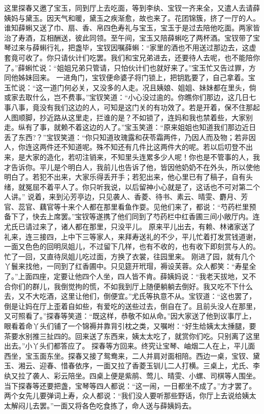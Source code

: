 \documentclass[12pt,oneside]{book}
\begin{document}
这里探春又邀了宝玉，同到厅上去吃面，等到李纨、宝钗一齐来全，又遣人去请薛姨妈与黛玉。因天气和暖，黛玉之疾渐愈，故也来了。花团锦簇，挤了一厅的人。
谁知薛蝌又送了巾、扇、香、帛四色寿礼与宝玉，宝玉于是过去陪他吃面。两家皆治了寿酒，互相酬送，彼此同领。至午间，宝玉又陪薛蝌吃了两杯酒。宝钗带了宝琴过来与薛蝌行礼，把盏毕，宝钗因嘱薛蝌：“家里的酒也不用送过那边去，这虚套竟可收了。你只请伙计们吃罢。我们和宝兄弟进去，还要待人去呢，也不能陪你了。”薛蝌忙说：“姐姐兄弟只管请，只怕伙计们也就好来了。”宝玉忙又告过罪，方同他姊妹回来。
一进角门，宝钗便命婆子将门锁上，把钥匙要了，自己拿着。宝玉忙说：“这一道门何必关，又没多的人走。况且姨娘、姐姐、妹妹都在里头，倘或家去取什么，岂不费事。”宝钗笑道：“小心没过逾的。你瞧你们那边，这几日七事八事，竟没有我们这边的人，可知是这门关的有功效了。若是开着，保不住那起人图顺脚，抄近路从这里走，拦谁的是？不如锁了，连妈和我也禁着些，大家别走。纵有了事，就赖不着这边的人了。”宝玉笑道：“原来姐姐也知道我们那边近日丢了东西?？”宝钗笑道：“你只知道玫瑰露和茯苓霜两件，乃因人而及物；若非因人，你连这两件还不知道呢。殊不知还有几件比这两件大的呢。若以后叨登不出来，是大家的造化，若叨注销来，不知里头连累多少人呢！你也是不管事的人，我才告诉你。平儿是个明白人，我前儿也告诉了他，皆因他奶奶不在外头，所以使他明白了。若犯不出来，大家乐得丢开手；若犯出来，他心里已有了稿子，自有头绪，就冤屈不着平人了。你只听我说，以后留神小心就是了，这话也不可对第二个人讲。”
说着，来到沁芳亭边，只见袭人、香菱、待书、素云、晴雯、麝月、芳官、蕊官、藕官等十来个人都在那里看鱼作耍。见他们来了，都说：“芍药栏里预备下了，快去上席罢。”宝钗等遂携了他们同到了芍药栏中红香圃三间小敞厅内。连尤氏已请过来了，诸人都在那里，只没平儿。
原来平儿出去，有赖、林诸家送了礼来，连三接四，上中下三等家人，来拜寿送礼的不少，平儿忙着打发赏钱道谢，一面又色色的回明凤姐儿，不过留下几样，也有不收的，也有收下即刻赏与人的。忙了一回，又直待凤姐儿吃过面，方换了衣裳，往园里来。
刚进了园，就有几个丫鬟来找他，一同到了红香圃中。只见筵开玳瑁，褥设芙蓉。众人都笑：“寿星全了。”上面四座，定要让他四个人坐，四人皆不肯。薛姨妈说：“我老天拔地，又不合你们的群儿，我倒觉拘的慌，不如我到厅上随便躺躺去倒好。我又吃不下什么去，又不大吃酒，这里让他们，倒便宜。”尤氏等执意不从。宝钗道：“这也罢了，倒是让妈在厅上歪着自如些，有爱吃的送些过去，倒自在了。且前头没人在那里，又可照看了。”探春等笑道：“既这样，恭敬不如从命。”因大家送了他到议事厅上，眼看着命丫头们铺了一个锦褥并靠背引枕之类，又嘱咐：“好生给姨太太捶腿，要茶要水别推三扯四的。回来送了东西来，姨太太吃了，就赏你们吃。只别离了这里出去。”小丫头们都答应了。
探春等方回来。终究让宝琴、岫烟二人在上，平儿面西坐，宝玉面东坐。探春又接了鸳鸯来，二人并肩对面相陪。西边一桌，宝钗、黛玉、湘云、迎春、惜春依序，一面又拉了香菱玉钏儿二人打横。三桌上，尤氏、李纨又拉了袭人、彩云陪坐。四桌上便是紫鹃、莺儿、晴雯、小螺、司棋等人围坐。当下探春等还要把盏，宝琴等四人都说：“这一闹，一日都坐不成了。”方才罢了。两个女先儿要弹词上寿，众人都说：“我们没人要听那些野话，你厅上去说给姨太太解闷儿去罢。”一面又将各色吃食拣了，命人送与薛姨妈去。
\end{document}
